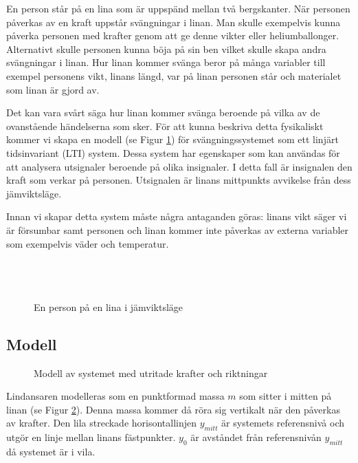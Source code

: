 En person står på en lina som är uppspänd mellan två bergskanter. När personen påverkas av en kraft uppstår svängningar i linan.
Man skulle exempelvis kunna påverka personen med krafter genom att ge denne vikter eller heliumballonger. Alternativt skulle personen kunna böja på sin ben vilket skulle skapa andra svängningar i linan.
Hur linan kommer svänga beror på många variabler till exempel personens vikt, linans längd, var på linan personen står och materialet som linan är gjord av. 

Det kan vara svårt säga hur linan kommer svänga beroende på vilka av de ovanstående händelserna som sker.
För att kunna beskriva detta fysikaliskt kommer vi skapa en modell (se Figur \ref{fig:skiss}) 
för svängningssystemet som ett linjärt tidsinvariant (LTI) system. 
Dessa system har egenskaper som kan användas för att analysera utsignaler beroende på olika insignaler. 
I detta fall är insignalen den kraft som verkar på personen.
Utsignalen är linans mittpunkts avvikelse från dess jämviktsläge.

Innan vi skapar detta system måste några antaganden göras: linans vikt säger vi är försumbar samt personen och linan kommer inte påverkas av externa variabler som exempelvis väder och temperatur. 
\\\\\\\\
\begin{figure}[h] 
    \centering
    \scalebox{1.2}{}
    \caption{En person på en lina i jämviktsläge}    
    \label{fig:skiss}
\end{figure}

\newpage\subsection{Modell}

\begin{figure}[h] %
    \centering
    
    \caption{Modell av systemet med utritade krafter och riktningar}
    \label{fig:modell}
\end{figure}

Lindansaren modelleras som en punktformad massa $m$ som sitter i mitten på linan (se Figur \ref{fig:modell}). 
Denna massa kommer då röra sig vertikalt när den påverkas av krafter.
Den lila streckade horisontallinjen $y_{mitt}$ är systemets referensnivå och utgör en linje mellan linans fästpunkter. $y_0$ är avståndet från referensnivån $y_{mitt}$ då systemet är i vila.

